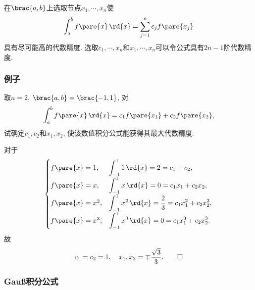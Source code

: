 \documentclass[hidelinks]{ctexart}
\begin{document}
在$\brac{a,b}$上选取节点$x_1,\cdots,x_n$使
\[ \int_a^b f\pare{x}\,\rd{x} = \sum_{j=1}^n c_jf\pare{x_j} \]
具有尽可能高的代数精度. 选取$c_1,\cdots,x_n$和$x_1,\cdots,x_n$可以令公式具有$2n-1$阶代数精度.

\subsubsection{例子} %
\label{ssub:例子}

\begin{ex}
    取$n=2$, $\brac{a,b} = \brac{-1,1}$, 对
    \[ \int_a^b f\pare{x}\,\rd{x} = c_1f\pare{x_1} + c_2f\pare{x_2}, \]
    试确定$c_1,c_2$和$x_1,x_2$, 使该数值积分公式能获得其最大代数精度.
\end{ex}
\begin{solution}
    对于
    \[ \begin{cases}
        f\pare{x} = 1, & \displaystyle \int_{-1}^1 1\,\rd{x} = 2 = c_1 + c_2, \\
        f\pare{x} = x, & \displaystyle \int_{-1}^1 x\,\rd{x} = 0 = c_1x_1 + c_2x_2, \\
        f\pare{x} = x^2, & \displaystyle \int_{-1}^1 x^2\,\rd{x} = \frac{2}{3} = c_1x_1^2 + c_2x_2^2, \\
        f\pare{x} = x^3, & \displaystyle \int_{-1}^1 x^3\,\rd{x} = 0 = c_1x_1^3 + c_2x_2^3.
    \end{cases} \]
    故
    \[ c_1 = c_2 = 1,\quad x_1,x_2 = \mp \frac{\sqrt{3}}{3}. \qedhere \]
\end{solution}


\subsubsection{\texorpdfstring{Gau\ss}{Gauss}积分公式} %
\label{ssub:gauss积分公式}
\end{document}
